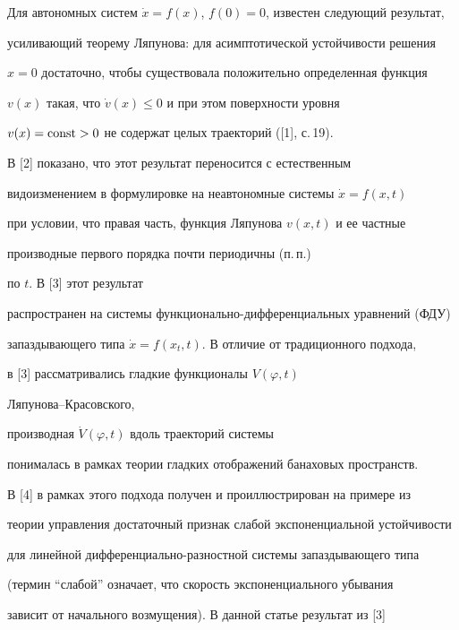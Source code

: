 

\maketitle


\label{begin}








Для автономных систем $\Dot x=f(x)$, $f(0)=0$, известен следующий результат,


усиливающий теорему Ляпунова: для асимптотической устойчивости решения


$x=0$ достаточно, чтобы существовала положительно определенная функция


$v(x)$ такая, что $\Dot v(x)\leqslant0$ и при этом поверхности уровня


$v(x)=\operatorname{const}>0$ не содержат целых траекторий ([1], с.\,19).


В [2] показано, что этот результат переносится с естественным


видоизменением в формулировке на неавтономные системы $\Dot x=f(x,t)$


при условии, что правая часть, функция Ляпунова $v(x,t)$ и ее частные


производные первого порядка почти периодичны (п.\,п.)


по $t$. В [3] этот результат


распространен на системы функционально-дифференциальных уравнений (ФДУ)


запаздывающего типа $\Dot x=f(x_t,t)$. В отличие от традиционного подхода,


в [3] рассматривались гладкие функционалы $V(\varphi,t)$ 


Ляпунова--Красовского, 


производная $\Dot V(\varphi,t)$ вдоль траекторий системы


понималась в рамках теории гладких отображений банаховых пространств.


В [4] в рамках этого подхода получен и проиллюстрирован на примере из


теории управления достаточный признак слабой экспоненциальной устойчивости


для линейной дифференциально-разностной системы запаздывающего типа


(термин ``слабой'' означает, что скорость экспоненциального убывания


зависит от начального возмущения). В данной статье результат из [3]


